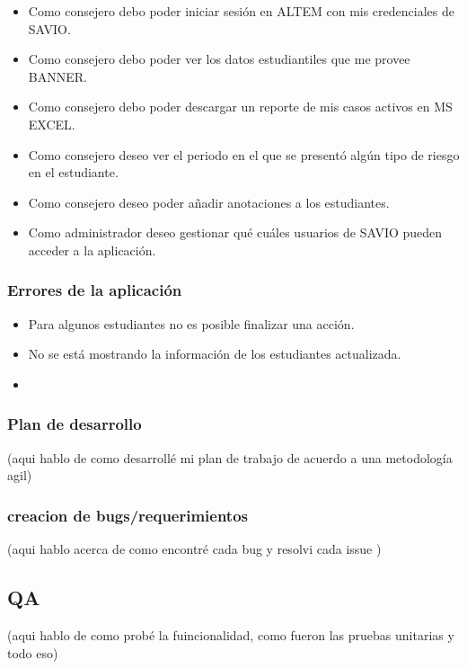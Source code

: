 \begin{itemize}
    \item Como consejero debo poder iniciar sesión en ALTEM con mis credenciales de SAVIO.
    \item Como consejero debo poder ver los datos estudiantiles que me provee BANNER.
    \item Como consejero debo poder descargar un reporte de mis casos activos en MS EXCEL.
    \item Como consejero deseo ver el periodo en el que se presentó algún tipo de riesgo en el estudiante.
    \item Como consejero deseo poder añadir anotaciones a los estudiantes.
    \item Como administrador deseo gestionar qué cuáles usuarios de SAVIO pueden acceder a la aplicación.
\end{itemize}

\subsubsection{Errores de la aplicación}

\begin{itemize}
    \item Para algunos estudiantes no es posible finalizar una acción.
    \item No se está mostrando la información de los estudiantes actualizada.
    \item 
\end{itemize}

\subsubsection{Plan de desarrollo}


(aqui hablo de como desarrollé mi plan de trabajo de acuerdo a una metodología agil)

\subsubsection{creacion de bugs/requerimientos}
(aqui hablo acerca de como encontré cada bug y resolvi cada issue )

\subsection{QA}
(aqui hablo de como probé la fuincionalidad, como fueron las pruebas unitarias y todo eso)
